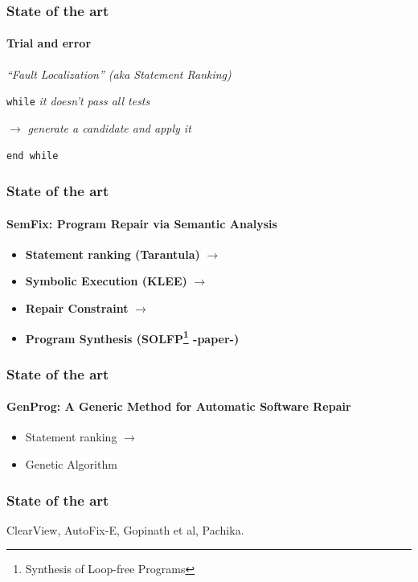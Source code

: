 \documentclass{beamer}
\begin{document}
  \frame
  {
    \frametitle{State of the art}
    \framesubtitle{Trial and error}
\textit{``Fault Localization'' (aka Statement Ranking)}

\texttt{while} \textit{it doesn't pass all tests}

$\rightarrow$ \textit{generate a candidate and apply it}

\texttt{end while}
}


{
  \frame
  {
    \frametitle{State of the art}
    \framesubtitle{SemFix: Program Repair via Semantic Analysis}
\begin{itemize}
\item \textbf{Statement ranking (Tarantula)} $\rightarrow$
\item \textbf{Symbolic Execution (KLEE)} $\rightarrow$
\item \textbf{Repair Constraint} $\rightarrow$
\item \textbf{Program Synthesis (SOLFP\footnote{Synthesis of Loop-free Programs} -paper-)}
\end{itemize}
 }
 }


  \frame
  {
    \frametitle{State of the art}
    \framesubtitle{GenProg: A Generic Method for Automatic Software Repair}
\begin{itemize}
\item Statement ranking $\rightarrow$
\item Genetic Algorithm
\end{itemize}
    
}

  \frame
  {
    \frametitle{State of the art}
    ClearView, AutoFix-E, Gopinath et al, Pachika.
  }
\end{document}

